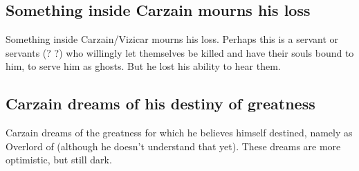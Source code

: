 \subsection{Something inside Carzain mourns his loss}
Something inside Carzain/Vizicar mourns his loss. Perhaps this is a servant or servants (\humans? \resphain?) who willingly let themselves be killed and have their souls bound to him, to serve him as ghosts. But he lost his ability to hear them.










\subsection{Carzain dreams of his destiny of greatness}
Carzain dreams of the greatness for which he believes himself destined, namely as Overlord of \Mystraacht{} (although he doesn't understand that yet). 
These dreams are more optimistic, but still dark. 


